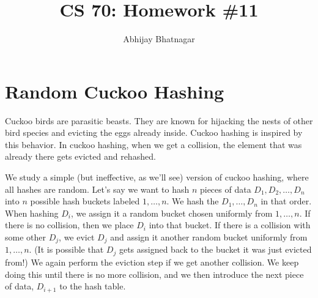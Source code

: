 \documentclass[11pt, notitlepage]{article}
\makeatletter
\newcommand{\Question}[1]{\newpage\section{#1}}
\newcommand*{\toccontents}{\@starttoc{toc}}
\makeatother
\begin{document}
   \title{CS 70: Homework \#11}
   \author{Abhijay Bhatnagar}
   \maketitle
   \toccontents

\Question{Random Cuckoo Hashing}

Cuckoo birds are parasitic beasts. They are known for hijacking the nests of other bird species and evicting the eggs already inside. Cuckoo hashing is inspired by this behavior. In cuckoo hashing, when we get a collision, the element that was already there gets evicted and rehashed.

We study a simple (but ineffective, as we'll see) version of cuckoo hashing, where all hashes are random. Let's say we want to hash $n$ pieces of data $D_1, D_2, \ldots, D_n$ into $n$ possible hash buckets labeled $1, \ldots, n$. We hash the $D_1, \ldots, D_n$ in that order. When hashing $D_i$, we assign it a random bucket chosen uniformly from $1, \ldots, n$. If there is no collision, then we place $D_i$ into that bucket. If there is a collision with some other $D_j$, we evict $D_j$ and assign it another random bucket uniformly from $1, \ldots, n$. (It is possible that $D_j$ gets assigned back to the bucket it was just evicted from!) We again perform the eviction step if we get another collision. We keep doing this until there is no more collision, and we then introduce the next piece of data, $D_{i + 1}$ to the hash table. 
\end{document}
